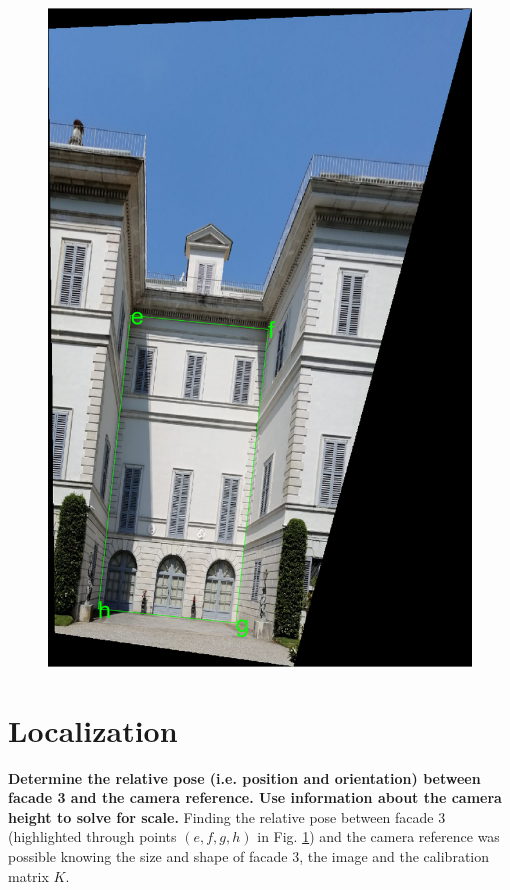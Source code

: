 \documentclass[11pt, oneside]{article}
\begin{document}
\begin{figure}[!h]
\begin{minipage}{.5\textwidth}
		\includegraphics[scale = 0.4]{image_rectification_vertical_facade.png}
		\label{image_rectification_vertical_facade}
	\end{minipage}
\end{figure}
\pagebreak

\section{Localization}
\textbf{Determine the relative pose (i.e. position and orientation) between facade 3 and the camera reference. Use information about the camera height to solve for scale.} \hfill \break
Finding the relative pose between facade 3 (highlighted through points $(e, f, g, h)$ in Fig. \ref{image_rectification_vertical_facade}) and the camera reference was possible knowing the size and shape of facade 3, the image and the calibration matrix $K$.
\end{document}
